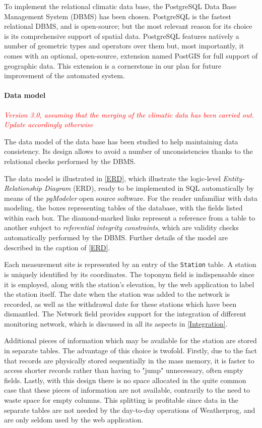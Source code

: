 \documentclass[authoryear,preprint,review,12pt]{elsarticle}
\newcommand{\note}[1]{\emph{\textcolor{red}{#1}}}
\begin{document}
To implement the relational climatic data base, the PostgreSQL Data Base Management System (DBMS) \citep{postgres:postgresql} has been chosen. PostgreSQL is the fastest relational DBMS, and is open-source; but the most relevant reason for its choice is its comprehensive support of spatial data. PostgreSQL features natively a number of geometric types and operators over them but, most importantly, it comes with an optional, open-source, extension named PostGIS  \citep{postgis:postgis} for full support of geographic data. This extension is a cornerstone in our plan for future improvement of the automated system.

\paragraph{Data model}
\note{Version 3.0, assuming that the merging of the climatic data has been carried out. Update accordingly otherwise}

The data model of the data base has been studied to help maintaining data consistency. Its design allows to avoid a number of unconsistencies thanks to the relational checks performed by the DBMS. 

The data model is illustrated in  \cref{ERD}, which illustrate the logic-level \emph{Entity-Relationship Diagram} (ERD), ready to be implemented in SQL automatically by means of the \emph{pgModeler} \citep{silva:pgmodeler} open source software. For the reader unfamiliar with data modeling, the boxes representing tables of the database, with the fields listed within each box. The diamond-marked links represent a reference from a table to another subject to \emph{referential integrity constraints}, which are validity checks automatically performed by the DBMS. Further details of the model are described in the caption of \cref{ERD}.

Each measurement site is represented by an entry of the \texttt{Station} table. A station is uniquely identified by its coordinates. The toponym field is indispensable since it is employed, along with the station's elevation, by the web application to label the station itself. The date when the station was added to the network is recorded, as well as the withdrawal date for these stations which have been dismantled. The Network field provides support for the integration of different monitoring network, which is discussed in all its aspects in \cref{Integration}.

Additional pieces of information which may be available for the station are stored in separate tables. The advantage of this choice is twofold. Firstly, due to the fact that records are physically stored sequentially in the mass memory,  it is faster to access shorter records rather than having to "jump" unnecessary, often empty fields. Lastly, with this design there is no space allocated in the quite common case that these pieces of information are not available, contrarily to the need to waste space for empty columns. This splitting is profitable since data in the separate tables are not needed by the day-to-day operations of Weatherprog, and are only seldom used by the web application.
\end{document}
